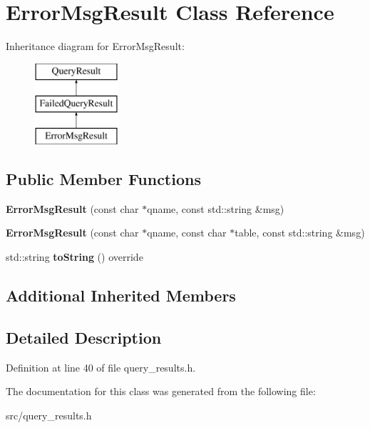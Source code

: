 \hypertarget{class_error_msg_result}{}\section{Error\+Msg\+Result Class Reference}
\label{class_error_msg_result}
Inheritance diagram for Error\+Msg\+Result\+:\begin{figure}[H]
\begin{center}
\leavevmode
\includegraphics[height=3.000000cm]{class_error_msg_result}
\end{center}
\end{figure}
\subsection*{Public Member Functions}
\begin{DoxyCompactItemize}
\item 
\mbox{\label{class_error_msg_result_a29e5dbbffb8b5f0bd62d00426fe3eb4b}} 
{\bfseries Error\+Msg\+Result} (const char $\ast$qname, const std\+::string \&msg)
\item 
\mbox{\label{class_error_msg_result_aa45c38fbcbc8e893a96221938d3d4d32}} 
{\bfseries Error\+Msg\+Result} (const char $\ast$qname, const char $\ast$table, const std\+::string \&msg)
\item 
\mbox{\label{class_error_msg_result_a6cf0d89a560e0857bbb95a702e0fbfc8}} 
std\+::string {\bfseries to\+String} () override
\end{DoxyCompactItemize}
\subsection*{Additional Inherited Members}


\subsection{Detailed Description}


Definition at line 40 of file query\+\_\+results.\+h.



The documentation for this class was generated from the following file\+:\begin{DoxyCompactItemize}
\item 
src/query\+\_\+results.\+h\end{DoxyCompactItemize}
